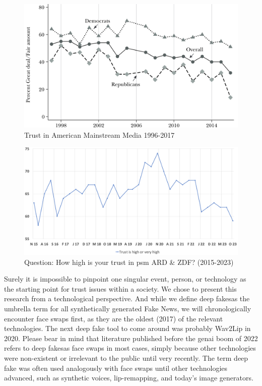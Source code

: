 \documentclass[
  a4paper,  %
  twoside,  %
  bibliography=totoc,
  headsepline,
  cleardoublepage=empty,
  parskip=half,
  draft=false
]{scrbook}
\begin{document}
\begin{figure}[h]
  \centering
  \centering
  \includegraphics[width=0.75\linewidth]{./graphics/images/trust-america mainstream.png}
  \caption{Trust in American Mainstream Media 1996-2017 \cite{allcottSocialMediaFake2017}}
  \label{fig:trust-us}
\end{figure}
\begin{figure}[h]
  \centering
  \includegraphics[width=0.8\linewidth]{./graphics/images/FGW-Trust-in-ARDZDF.png}
  \caption{Question: How high is your trust in \gls{psm} ARD \& ZDF? (2015-2023) \cite{zdf-politbarometerVertrauenGlaubwuerdigkeitBerichterstattung2023}}
  \label{fig:trust-ger}
\end{figure}
Surely it is impossible to pinpoint one singular event, person, or technology as the starting point for trust issues within a society. We chose to present this research from a technological perspective. And while we define deep fakesas the umbrella term for all synthetically generated Fake News, we will chronologically encounter face swaps first, as they are the oldest (2017) of the relevant technologies. The next deep fake tool to come around was probably Wav2Lip in 2020. Please bear in mind that literature published before the \gls{genai} boom of 2022 refers to deep fakesas face swaps in most cases, simply because other technologies were non-existent or irrelevant to the public until very recently. The term deep fake was often used analogously with face swaps until other technologies advanced, such as synthetic voices, lip-remapping, and today's image generators.
\end{document}
